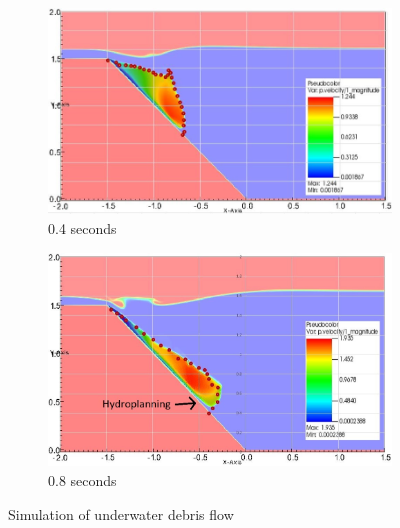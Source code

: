\documentclass[preprint,12pt]{elsarticle}
\begin{document}
\begin{figure}
\center
\begin{subfigure}[c]{0.5\linewidth}
\includegraphics[width=\linewidth]{1.jpg}
\caption{0.4 seconds}
\label{0.4s}
\end {subfigure}\hfill    
\begin{subfigure}[d]{0.5\linewidth}
\includegraphics[width=\linewidth]{2.jpg}
\caption{0.8 seconds}
\label{0.8s}
\end {subfigure}
\caption{Simulation of underwater debris flow}
\label{fig:debris}
\end {figure}
%
%
\end{document}
